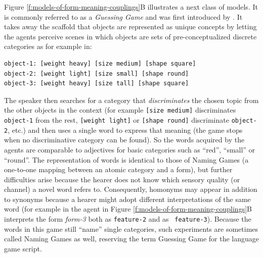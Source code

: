 Figure \ref{f:models-of-form-meaning-couplings}B illustrates a next
class of models. It is commonly referred to as a \emph{Guessing Game}
and was first introduced by \cite{steels96emergent}. It takes away the
scaffold that objects are represented as unique concepts by letting
the agents perceive scenes in which objects are sets of
pre-conceptualized discrete categories as for example in:
\begin{verbatim}
object-1: [weight heavy] [size medium] [shape square]
object-2: [weight light] [size small] [shape round]
object-3: [weight heavy] [size tall] [shape square]
\end{verbatim}
\noindent The speaker then searches for a category that
\emph{discriminates} the chosen topic from the other objects in the
context (for example {\tt [size medium]} discriminates {\tt object-1}
from the rest, {\tt [weight light]} or {\tt [shape round]}
discriminate {\tt object-2}, etc.) and then uses a single word to
express that meaning (the game stops when no discriminative category
can be found). So the words acquired by the agents are comparable to
adjectives for basic categories such as ``red'', ``small'' or
``round''. The representation of words is identical to those of Naming
Games (a one-to-one mapping between an atomic category and a form), but
further difficulties arise because the hearer does not know which
sensory quality (or channel) a novel word refers to. Consequently,
homonyms may appear in addition to synonyms because a hearer might
adopt different interpretations of the same word (for example in the
agent in Figure \ref{f:models-of-form-meaning-couplings}B interprets
the form \emph{form-3} both as {\tt feature-2} and as {\tt
  feature-3}). Because the words in this game still ``name'' single
categories, such experiments are sometimes called Naming Games as
well, reserving the term Guessing Game for the language game script.

